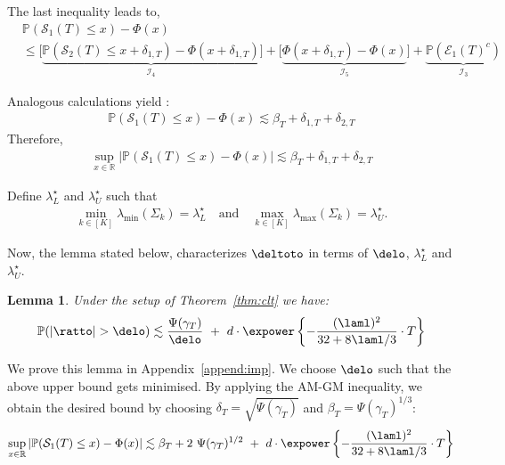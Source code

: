 \documentclass[11pt,letterpaper]{article}
\newcommand{\Prob}{\mathbb{P}}
\newcommand{\real}{\mathbb{R}}
\newcommand{\err}{\Psi(\gamma_T)}
\newcommand{\stao}{\mathcal{S}_1(T)}
\newcommand{\stato}{\mathcal{S}_2(T)}
\newcommand{\Eone}{\mathcal{E}_1(T)}
\theoremstyle{plain}
\newtheorem{lemma}{Lemma}
\theoremstyle{definition}  %
\begin{document}
\noindent The last inequality leads to,
\begin{align*}
    &\Prob(\stao \leq x) - \Phi(x)\\[8pt]
    & \leq \bigg[ \underbrace{\Prob(\stato \leq x+\delta_{1,T}) - \Phi(x+\delta_{1,T})}_{\mathcal{I}_4} \bigg]
    + \bigg[ \underbrace{\Phi(x+\delta_{1,T}) - \Phi(x)}_{\mathcal{I}_5} \bigg]
    + \underbrace{\Prob(\Eone^c )}_{\mathcal{I}_3}
\end{align*}


\noindent Analogous calculations yield :
\begin{align}
  \Prob(\stao \leq x) - \Phi(x) \lesssim  \beta_T +\delta_{1,T} + \delta_{2,T}
\end{align}
\noindent Therefore,
\begin{align*}
    \sup_{x\in \real} |\Prob(\stao \leq x) - \Phi(x) |
    \lesssim  \beta_T +\delta_{1,T} + \delta_{2,T}
\end{align*}

\noindent \noindent Define $\lambda^\star_L$ and $\lambda^\star_U$ such that 
\begin{align}\label{defn:laml-lamu}
    \min_{k \in [K]}\lambda_{\min}(\Sigma_k) = \lambda^\star_L \quad \text{and} \quad 
    \max_{k \in [K]}\lambda_{\max}(\Sigma_k) = \lambda^\star_U.
\end{align}

\noindent Now, the lemma stated below, characterizes $\deltoto$ in terms of $\delo$, $ \lambda^\star_L$ and $\lambda^\star_U$.
\begin{lemma}\label{lemma:ratto}
     Under the setup of Theorem~\ref{thm:clt} we have:
    \begin{align}\label{eqn:ratto}
       \Prob (|\ratto| > \delo) \lesssim \frac{\err}{\delo} \ + \  d \cdot \expower\left\{ - \frac{(\laml)^2}{32 +  8\laml/3} \cdot  T\right\}
    \end{align}
\end{lemma}


\noindent We prove this lemma in Appendix~\ref{append:imp}.
We choose $\delo$ such that the above upper bound gets minimised.   By applying the AM-GM inequality, we obtain the desired bound by choosing $\delta_T = \sqrt{\err}$ and $\beta_T = \err^{1/3}$:
\begin{align*}
    \sup_{x\in \real} |\Prob(\stao \leq x) - \Phi(x) |
    \lesssim \beta_T + 2 \ \err^{1/2} \ + \  d \cdot \expower\left\{ - \frac{(\laml)^2}{32 +  8\laml/3} \cdot  T\right\}
\end{align*}
\end{document}

